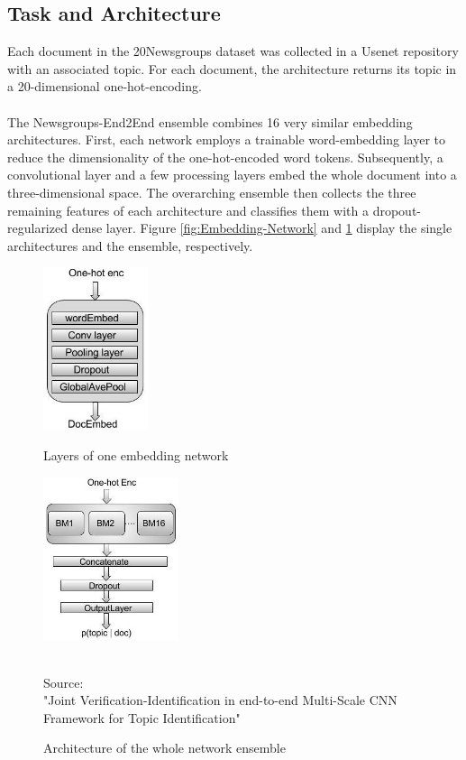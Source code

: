 \subsection*{Task and Architecture}
Each document in the 20Newsgroups dataset was collected in a Usenet repository with an associated topic. For each document, the architecture returns its topic in a 20-dimensional one-hot-encoding.\\
\\
The Newsgroups-End2End ensemble combines 16 very similar embedding architectures. First, each network employs a trainable word-embedding layer to reduce the dimensionality of the one-hot-encoded word tokens. Subsequently, a convolutional layer and a few processing layers embed the whole document into a three-dimensional space. The overarching ensemble then collects the three remaining features of each architecture and classifies them with a dropout-regularized dense layer. Figure \ref{fig:Embedding-Network} and \ref{fig:Ensemble} display the single architectures and the ensemble, respectively.
\begin{figure}
	\centering
	\begin{minipage}{0.5\textwidth}
		\centering
		\includegraphics[height=180px]{gfx/4-Design/base_module.png}
		\caption{Layers of one embedding network}
		\label{fig:Embedding-Network}
	\end{minipage}\hfill
	\begin{minipage}{0.5\textwidth}
		\centering
		\includegraphics[height=180px]{gfx/4-Design/combined_model.png}
		\caption{Architecture of the whole network ensemble}
		\label{fig:Ensemble}
	\end{minipage}
	\vspace{7pt}
	\footnotesize{ 
		\\
		Source:\\
		"Joint Verification-Identification in end-to-end Multi-Scale CNN Framework for Topic Identification" \cite{End-to-End-CNN}
	}
\end{figure}

